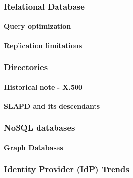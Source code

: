 \hypertarget{relational-database}{%
\subsubsection{Relational Database}\label{relational-database}}

\hypertarget{query-optimization}{%
\paragraph{Query optimization}\label{query-optimization}}

\hypertarget{replication-limitations}{%
\paragraph{Replication limitations}\label{replication-limitations}}

\hypertarget{directories}{%
\subsubsection{Directories}\label{directories}}

\hypertarget{historical-note---x.500}{%
\paragraph{Historical note - X.500}\label{historical-note---x.500}}

\hypertarget{slapd-and-its-descendants}{%
\paragraph{SLAPD and its
descendants}\label{slapd-and-its-descendants}}

\hypertarget{nosql-databases}{%
\subsubsection{NoSQL databases}\label{nosql-databases}}

\hypertarget{graph-databases}{%
\paragraph{Graph Databases}\label{graph-databases}}

\hypertarget{identity-provider-idp-trends}{%
\subsubsection{Identity Provider (IdP)
Trends}\label{identity-provider-idp-trends}}

